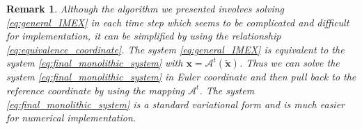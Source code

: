\documentclass{article}
\newcommand{\bx}{{\mathbf{x}}}
\newtheorem{remark}[theorem]{Remark}
\begin{document}
\begin{remark}
Although the algorithm we presented involves solving \eqref{eq:general_IMEX} in each time step which seems to be complicated and difficult for implementation, it can be simplified by using the relationship \eqref{eq:equivalence_coordinate}. The system \eqref{eq:general_IMEX} is equivalent to the system \eqref{eq:final_monolithic_system} with $\bx = \mathcal{A}^t(\tilde{\bx})$. Thus we can solve the system \eqref{eq:final_monolithic_system} in Euler coordinate and then pull back to the reference coordinate by using the mapping $\mathcal{A}^t$. The system \eqref{eq:final_monolithic_system} is a standard variational form and is much easier for numerical implementation.
\end{remark}

\end{document}

